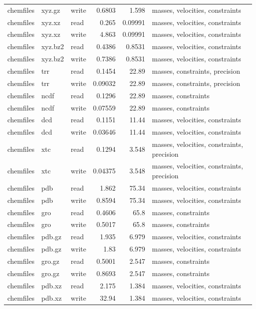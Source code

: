 {\begin{longtable}{@{}lllrr p{}@{}}
chemfiles & xyz.gz & write & 0.6803 & 1.598 & masses, velocities, constraints \\
chemfiles & xyz.xz & read & 0.265 & 0.09991 & masses, velocities, constraints \\
chemfiles & xyz.xz & write & 4.863 & 0.09991 & masses, velocities, constraints \\
chemfiles & xyz.bz2 & read & 0.4386 & 0.8531 & masses, velocities, constraints \\
chemfiles & xyz.bz2 & write & 0.7386 & 0.8531 & masses, velocities, constraints \\
chemfiles & trr & read & 0.1454 & 22.89 & masses, constraints, precision \\
chemfiles & trr & write & 0.09032 & 22.89 & masses, constraints, precision \\
chemfiles & ncdf & read & 0.1296 & 22.89 & masses, constraints \\
chemfiles & ncdf & write & 0.07559 & 22.89 & masses, constraints \\
chemfiles & dcd & read & 0.1151 & 11.44 & masses, velocities, constraints \\
chemfiles & dcd & write & 0.03646 & 11.44 & masses, velocities, constraints \\
chemfiles & xtc & read & 0.1294 & 3.548 & masses, velocities, constraints, precision \\
chemfiles & xtc & write & 0.04375 & 3.548 & masses, velocities, constraints, precision \\
chemfiles & pdb & read & 1.862 & 75.34 & masses, velocities, constraints \\
chemfiles & pdb & write & 0.8594 & 75.34 & masses, velocities, constraints \\
chemfiles & gro & read & 0.4606 & 65.8 & masses, constraints \\
chemfiles & gro & write & 0.5017 & 65.8 & masses, constraints \\
chemfiles & pdb.gz & read & 1.935 & 6.979 & masses, velocities, constraints \\
chemfiles & pdb.gz & write & 1.83 & 6.979 & masses, velocities, constraints \\
chemfiles & gro.gz & read & 0.5001 & 2.547 & masses, constraints \\
chemfiles & gro.gz & write & 0.8693 & 2.547 & masses, constraints \\
chemfiles & pdb.xz & read & 2.175 & 1.384 & masses, velocities, constraints \\
chemfiles & pdb.xz & write & 32.94 & 1.384 & masses, velocities, constraints \\

\end{longtable}}
